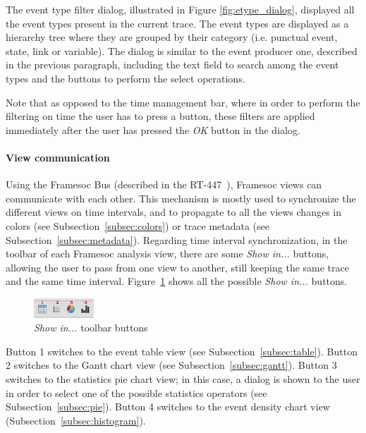 \documentclass[twoside]{article}
\begin{document}
\begin{sloppypar}
The event type filter dialog, illustrated in Figure \ref{fig:etype_dialog}, displayed all the event types present in the current trace. The event types are displayed as a hierarchy tree where they are grouped by their category (i.e. punctual event, state, link or variable). The dialog is similar to the event producer one, described in the previous paragraph, including the text field to search among the event types and the buttons to perform the select operations.

Note that as opposed to the time management bar, where in order to perform the filtering on time the user has to press a button, these filters are applied immediately after the user has pressed the \emph{OK} button in the dialog.

\paragraph{View communication} Using the Framesoc Bus (described in the RT-447~\cite{pagano:hal-00977887}), Framesoc views can communicate with each other. This mechanism is mostly used to synchronize the different views on time intervals, and to propagate to all the views changes in colors (see Subsection~\ref{subsec:colors}) or trace metadata (see Subsection~\ref{subsec:metadata}).
Regarding time interval synchronization, in the toolbar of each Framesoc analysis view, there are some \emph{Show in...} buttons, allowing the user to pass from one view to another, still keeping the same trace and the same time interval. Figure~\ref{fig:show_in} shows all the possible \emph{Show in...} buttons. 

\begin{figure}[h!]
  \centering
    \includegraphics[width=0.2\textwidth]{images/show_in_icons.png}
  \caption{\emph{Show in...} toolbar buttons}
  \label{fig:show_in}
\end{figure}

Button \num{1} switches to the event table view (see Subsection~\ref{subsec:table}). Button \num{2} switches to the Gantt chart view (see Subsection~\ref{subsec:gantt}). Button \num{3} switches to the statistics pie chart view; in this case, a dialog is shown to the user in order to select one of the possible statistics operators (see Subsection~\ref{subsec:pie}). Button \num{4} switches to the event density chart view (Subsection~\ref{subsec:histogram}).


\end{sloppypar}
\end{document}
